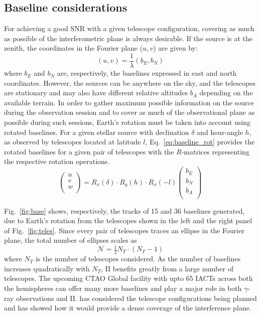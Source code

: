 \subsection{Baseline considerations}\label{sec:earth}
For achieving a good SNR with a given telescope configuration, covering as much as possible of the interferometric plane is always desirable. If the source is at the zenith, the coordinates in the Fourier plane ($u,v$) are given by:
\begin{equation}
	(u,v) = \frac{1}{\lambda} (b_E, b_N)
\end{equation}
where $b_E$ and $b_N$ are, respectively, the baselines expressed in east and north coordinates. However, the sources can be anywhere on the sky, and the telescopes are stationary and may also have different relative altitudes $b_A$ depending on the available terrain. In order to gather maximum possible information on the source during the observation session and to cover as much of the observational plane as possible during such sessions, Earth's rotation must be taken into account using rotated baselines.  For a given stellar source with declination $\delta$ and hour-angle $h$, as observed by telescopes located at latitude $l$, Eq.~\ref{eq:baseline_rot} provides the rotated baselines for a given pair of telescopes \citep[see e.g., eqs.~8--10 from][]{2020MNRAS.498.4577B} with the $R$-matrices representing the respective rotation operations.
\begin{equation}
\begin{pmatrix} u\\ v\\ w\\ \end{pmatrix} = R_x(\delta) \cdot R_y(h) \cdot R_x(-l) \begin{pmatrix} b_E \\ b_N \\ b_A \\ \end{pmatrix}
	\label{eq:baseline_rot}
\end{equation}

Fig.~\ref{fig:base} shows, respectively, the tracks of 15 and 36 baselines generated, due to Earth's rotation from the telescopes shown in the left and the right panel of Fig.~\ref{fig:teles}. Since every pair of telescopes traces an ellipse in the Fourier plane, the total number of ellipses scales as
\begin{equation}
	\label{eq:N_telescopes}
	\mathcal{N} = \tfrac12 N_T \cdot (N_T -1)
\end{equation}
where $N_T$ is the number of telescopes considered.
As the number of baselines increases quadratically with $N_T$, II benefits greatly from a large number of telescopes. The upcoming CTAO Global facility with upto 65 IACTs across both the hemispheres can offer many more baselines and play a major role in both $\gamma$-ray observations and II. \cite{2013APh....43..331D} has considered the telescope configurations being planned and has showed how it would provide a dense coverage of the interference plane.

